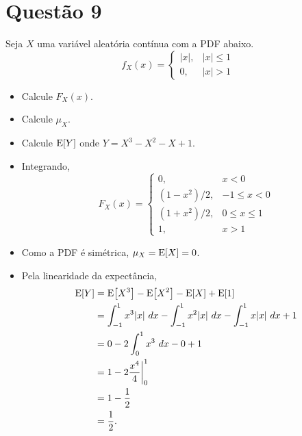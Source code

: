\section{Questão 9}
Seja $X$ uma variável aleatória contínua com a PDF abaixo.
%
\begin{equation*}
    f_X(x) = 
    \begin{cases}
        |x|,           & |x| \leq 1 \\
        0,             & |x| > 1
    \end{cases}
\end{equation*}

\begin{itemize}
    \item [a)] Calcule $F_X(x)$.
    \item [b)] Calcule $\mu_X$.
    \item [c)] Calcule $\mathrm{E}\!\left[Y\right]$ onde $Y = X^3 - X^2 - X + 1$.
\end{itemize}

\respostas

\begin{itemize}
    \item [a)] Integrando,
    \begin{equation}
        F_X(x) = 
        \begin{cases}
            0,         & x < 0 \\
            (1 - x^2)/2,     & -1 \leq x < 0 \\
            (1 + x^2)/2,       & 0 \leq x \leq 1 \\
            1,         & x > 1
        \end{cases}
    \end{equation}
    
    \item [b)] Como a PDF é simétrica, $\mu_X = \mathrm{E}\!\left[X\right] = 0$.

    \item [c)] Pela linearidade da expectância,
    \begin{align}
        \mathrm{E}\!\left[Y\right] 
        &= \mathrm{E}\!\left[X^3\right] - \mathrm{E}\!\left[X^2\right] - \mathrm{E}\!\left[X\right] + \mathrm{E}\!\left[1\right] \\
        &= \int_{-1}^1 x^3 |x| \ dx - \int_{-1}^1 x^2 |x| \ dx - \int_{-1}^1 x |x| \ dx + 1 \\
        &= 0 - 2\int_0^1 x^3 \ dx - 0 + 1 \\
        &= 1 - 2\frac{x^4}{4}\bigg|_0^1 \\
        &= 1 - \frac{1}{2} \\
        &= \frac{1}{2}.
    \end{align}
\end{itemize}